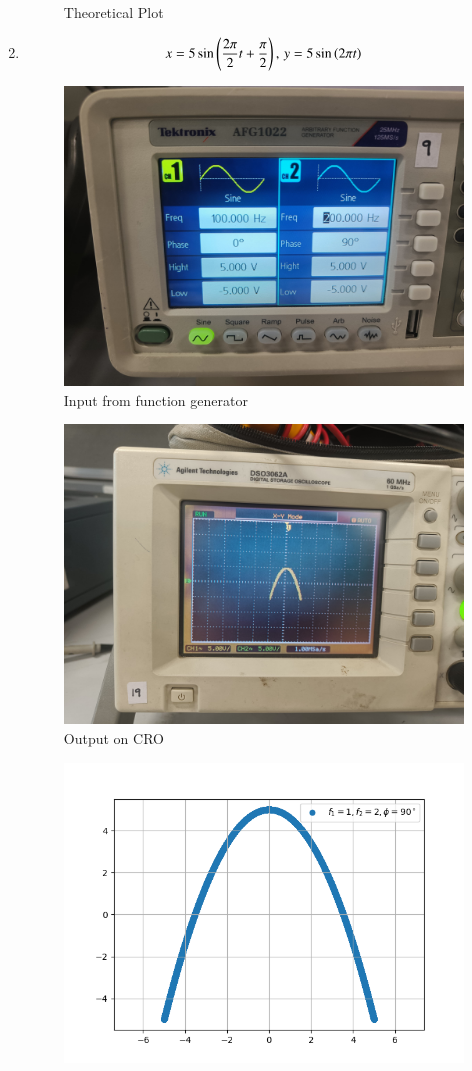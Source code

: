 \documentclass[journal]{IEEEtran}
\begin{document}
\begin{enumerate}
\begin{figure}[H]
        \caption{Theoretical Plot}
    \end{figure}
    \item \begin{align}
        x = 5\sin\left(\frac{2\pi}{2}t+\frac{\pi}{2}\right),\,y = 5\sin\left({2\pi}t\right)
    \end{align}
    \begin{figure}[H]
        \centering
        \includegraphics[width=0.7\columnwidth]{pics/WhatsApp Image 2025-01-24 at 11.02.12(1).jpeg}
        \caption{Input from function generator}
    \end{figure}
    \begin{figure}[H]
        \centering
        \includegraphics[width=0.7\columnwidth]{pics/WhatsApp Image 2025-01-24 at 11.02.12.jpeg}
        \caption{Output on CRO}
    \end{figure}
    \begin{figure}[H]
        \centering
        \includegraphics[width=0.7\columnwidth]{figs/fig7.png}

\end{figure}
\end{enumerate}
\end{document}

